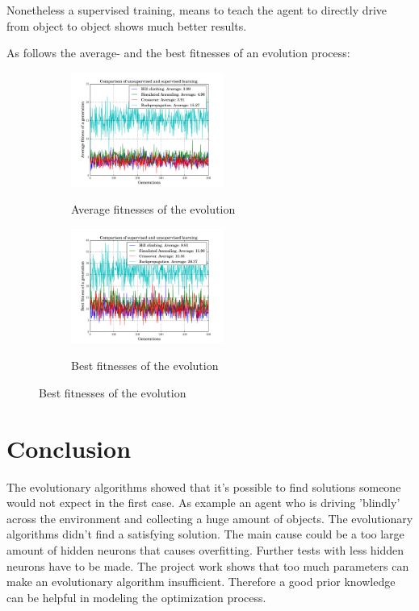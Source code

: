 \documentclass[10pt,a4paper,DIV=11]{scrreprt}
\begin{document}
Nonetheless a supervised training, means to teach the agent to directly drive from object to object shows much better results.\cite{Jona}

As follows the average- and the best fitnesses of an evolution process:

\begin{figure}[H]
	\begin{subfigure}[]{\textwidth}
		\centering
		\includegraphics[width=0.55\textwidth,scale=1.0]{files/all_average.pdf}
		\label{fig:result-avg}
		\caption{Average fitnesses of the evolution \cite{Jona}}
	\end{subfigure}
		\vspace{0.5cm}
	\begin{subfigure}[]{\textwidth}
		\centering
		\includegraphics[width=0.55\textwidth,scale=1.0]{files/all_best.pdf}
		\label{fig:result-best}
		\caption{Best fitnesses of the evolution \cite{Jona}}
	\end{subfigure}
\end{figure}

\chapter{Conclusion}

The evolutionary algorithms showed that it's possible to find solutions someone would not expect in the first case. As example an agent who is driving 'blindly' across the environment and collecting a huge amount of objects.
The evolutionary algorithms didn't find a satisfying solution. The main cause could be a too large amount of hidden neurons that causes overfitting.
Further tests with less hidden neurons have to be made.
The project work shows that too much parameters can make an evolutionary algorithm insufficient. Therefore a good prior knowledge can be helpful in modeling the optimization process.
\end{document}
